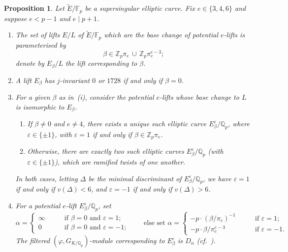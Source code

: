 \documentclass{amsart}
\newcommand{\Qp}{\mathbb{Q}_p}
\newtheorem{proposition}[theorem]{Proposition}
\theoremstyle{definition}
\newcommand{\Z}{\mathbb{Z}}
\newcommand{\Q}{\mathbb{Q}}
\newcommand{\F}{\mathbb{F}}
\numberwithin{theorem}{section}
\numberwithin{equation}{section}
\begin{document}
\begin{proposition}\label{prop: beta parameter}
Let $\tilde{E}/\mathbb{F}_p$ be a supersingular elliptic curve. Fix $e \in \{3,4,6\}$ and suppose $e<p-1$ and $e \mid p+1$.
\begin{enumerate}
    \item The set of lifts $E/L$ of $\tilde{E}/\F_p$ which are the base change of potential $e$-lifts is parameterised by
    \[
    \beta \in  \Z_p\pi_e \, \cup \, \Z_p\pi_e^{e-3};
    \]
    denote by $E_\beta / L$ the lift corresponding to $\beta$. 
    \item A lift $E_{\beta}$ has $j$-invariant $0$ or $1728$ if and only if $\beta=0$.
   \item
   For a given $\beta$ as in~(i), consider the potential $e$-lifts whose base change to $L$ is isomorphic to $E_\beta$. 
\begin{enumerate}
    \item If $\beta \neq 0$ and $e \neq 4$, there exists a unique such elliptic curve $E_\beta^{\varepsilon}/\Q_p$, where $\varepsilon \in \{\pm 1\}$, with $\varepsilon = 1$ if and only if $\beta \in \Z_p \pi_e$.

    \item Otherwise, there are exactly two such elliptic curves $E_\beta^{\varepsilon}/\Q_p$ (with $\varepsilon \in \{\pm 1\}$), which are ramified twists of one another.
\end{enumerate}
    In both cases, letting $\Delta$ be the minimal discriminant of $E_\beta^{\varepsilon}/\Q_p$, we have $\varepsilon=1$ if and only if $v(\Delta)<6$, and $\varepsilon=-1$ if and only if $v(\Delta)>6$.
    \item For a potential $e$-lift $E_\beta^{\varepsilon}/\Qp$, set
    \[
    \alpha = \begin{cases}
        \infty & \qquad \text{if } \beta=0 \text{ and }\varepsilon=1; \\
         0&  \qquad \text{if } \beta=0 \text{ and } \varepsilon=-1;
    \end{cases}
    \qquad \text{else set }
    \alpha = \begin{cases}
        -p \cdot (\beta/\pi_e)^{-1} & \qquad \text{if } \varepsilon=1; \\
        -p \cdot \beta/\pi_e^{e-3} &  \qquad \text{if } \varepsilon=-1.
    \end{cases}
    \] 
    The filtered $(\varphi,G_{K/\Qp})$-module corresponding to $E_{\beta}^{\varepsilon}$ is $D_\alpha$  (cf.~).
\end{enumerate}
\end{proposition}
\end{document}
